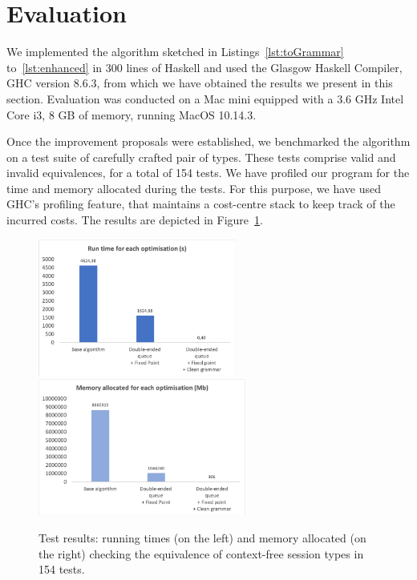 \section{Evaluation}
\label{sec:evaluation}


We implemented the algorithm sketched in Listings~\ref{lst:toGrammar}
to~\ref{lst:enhanced} in 300 lines of Haskell and used the Glasgow
Haskell Compiler, GHC version 8.6.3, from which we have obtained the
results we present in this section.  Evaluation was conducted on a Mac
mini equipped with a 3.6 GHz Intel Core i3, 8 GB of memory, running
MacOS 10.14.3.

Once the improvement proposals were established, we benchmarked the
algorithm on a test suite of carefully crafted pair of types. These
tests comprise valid and invalid equivalences, for a total of 154
tests. We have profiled our program for the time and memory allocated
during the tests. For this purpose, we have used GHC's profiling
feature, that maintains a cost-centre stack to keep track of the
incurred costs. The results are depicted in
Figure~\ref{fig:results}.

\begin{figure}[h]
	\includegraphics[height=4.5cm]{img/run_time}	\hspace*{5mm}
	\includegraphics[height=4.5cm]{img/memory_alloc}
	\caption{Test results: running times (on the left) and
	memory allocated (on the right) checking the equivalence
	of context-free session types in 154 tests.}
	\label{fig:results}
\end{figure}

